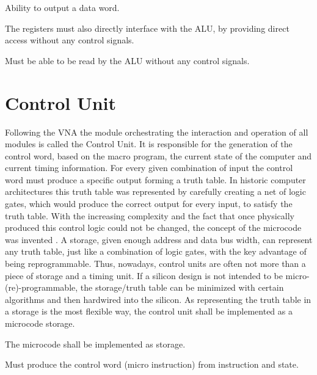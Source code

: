 \begin{feat-requirement}
  Ability to output a data word.
\end{feat-requirement}

The registers must also directly interface with the ALU, by providing direct access without any control signals. 

\begin{arch-requirement} \label{req:register-direct-access}
  Must be able to be read by the ALU without any control signals.
\end{arch-requirement}


\section{Control Unit}
Following the VNA the module orchestrating the interaction and operation of all modules is called the Control Unit. It is responsible for the generation of the control word, based on the macro program, the current state of the computer and current timing information. For every given combination of input the control word must produce a specific output forming a truth table. In historic computer architectures this truth table was represented by carefully creating a net of logic gates, which would produce the correct output for every input, to satisfy the truth table. With the increasing complexity and the fact that once physically produced this control logic could not be changed, the concept of the microcode was invented \cite{cite.needed}. A storage, given enough address and data bus width, can represent any truth table, just like a combination of logic gates, with the key advantage of being reprogrammable. Thus, nowadays, control units are often not more than a piece of storage and a timing unit. If a silicon design is not intended to be micro-(re)-programmable, the storage/truth table can be minimized with certain algorithms and then hardwired into the silicon. As representing the truth table in a storage is the most flexible way, the control unit shall be implemented as a microcode storage.

\begin{arch-requirement}
  The microcode shall be implemented as storage.
\end{arch-requirement}

\begin{arch-requirement}
  Must produce the control word (micro instruction) from instruction and state.
\end{arch-requirement}

